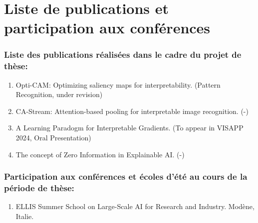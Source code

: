\newpage
\chapter*{Liste de publications et participation aux conférences}
\subsection*{Liste des publications réalisées dans le cadre du projet de thèse:}
\begin{enumerate}
    \item Opti-CAM: Optimizing saliency maps for interpretability. (Pattern Recognition, under revision)
    \item CA-Stream: Attention-based pooling for interpretable image recognition. (-)
    \item A Learning Paradogm for Interpretable Gradients. (To appear in VISAPP 2024, Oral Presentation)
    \item The concept of Zero Information in Explainable AI. (-)
\end{enumerate}


\subsection*{Participation aux conférences et écoles d’été au cours de la période de thèse:}
\begin{enumerate}
\item ELLIS Summer School on Large-Scale AI for Research and Industry. Modène, Italie.
\end{enumerate}
